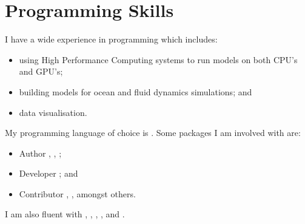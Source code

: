 \section{Programming Skills}

I have a wide experience in programming which includes:
\begin{itemize}
    \item[--] using High Performance Computing systems to run models on both CPU's and GPU's;
    \item[--] building models for ocean and fluid dynamics simulations; and 
    \item[--] data visualisation.
\end{itemize}
My programming language of choice is .
Some packages I am involved with are:
\begin{itemize}
    \item[--] Author , , ;
    \item[--] Developer ; and
    \item[--] Contributor , ,  amongst others.
\end{itemize}
I am also fluent with , , , ,  and .

